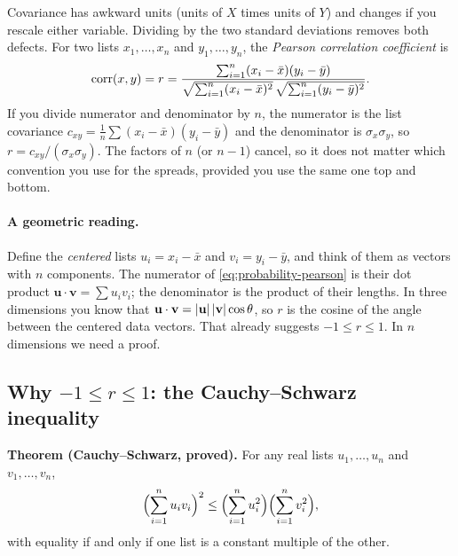 Covariance has awkward units (units of $X$ times units of $Y$) and changes if you rescale either variable. Dividing by the two standard deviations removes both defects. For two lists $x_1,\dots,x_n$ and $y_1,\dots,y_n$, the \emph{Pearson correlation coefficient} is
\begin{equation}
\mathrm{corr}(x,y) = r = \frac{\sum_{i=1}^n (x_i-\bar x)(y_i-\bar y)}{\sqrt{\sum_{i=1}^n (x_i-\bar x)^2}\,\sqrt{\sum_{i=1}^n (y_i-\bar y)^2}} .
\label{eq:probability-pearson}
\end{equation}
If you divide numerator and denominator by $n$, the numerator is the list covariance $c_{xy}=\frac1n\sum(x_i-\bar x)(y_i-\bar y)$ and the denominator is $\sigma_x\sigma_y$, so $r=c_{xy}/(\sigma_x\sigma_y)$. The factors of $n$ (or $n-1$) cancel, so it does not matter which convention you use for the spreads, provided you use the same one top and bottom.

\paragraph{A geometric reading.} Define the \emph{centered} lists $u_i=x_i-\bar x$ and $v_i=y_i-\bar y$, and think of them as vectors with $n$ components. The numerator of \cref{eq:probability-pearson} is their dot product $\mathbf u\cdot\mathbf v=\sum u_iv_i$; the denominator is the product of their lengths. In three dimensions you know that $\mathbf u\cdot\mathbf v=\left\lvert \mathbf u\right\rvert\left\lvert \mathbf v\right\rvert\cos\theta$, so $r$ is the cosine of the angle between the centered data vectors. That already suggests $-1\le r\le1$. In $n$ dimensions we need a proof.

\subsection{Why $-1\le r\le1$: the Cauchy--Schwarz inequality}

\textbf{Theorem (Cauchy--Schwarz, proved).} For any real lists $u_1,\dots,u_n$ and $v_1,\dots,v_n$,
\begin{equation}
\Bigl(\sum_{i=1}^n u_iv_i\Bigr)^2 \le \Bigl(\sum_{i=1}^n u_i^2\Bigr)\Bigl(\sum_{i=1}^n v_i^2\Bigr),
\label{eq:probability-cs}
\end{equation}
with equality if and only if one list is a constant multiple of the other.

